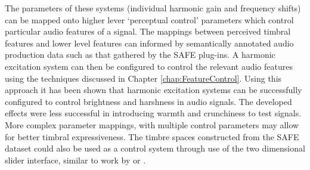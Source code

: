 	The parameters of these systems (individual harmonic gain and frequency shifts) can be mapped onto higher lever
	`perceptual control' parameters which control particular audio features of a signal. The mappings between perceived
	timbral features and lower level features can informed by semantically annotated audio production data such as that
	gathered by the SAFE plug-ins. A harmonic excitation system can then be configured to control the relevant audio
	features using the techniques discussed in Chapter \ref{chap:FeatureControl}. Using this approach it has been shown
	that harmonic excitation systems can be successfully configured to control brightness and harshness in audio
	signals. The developed effects were less successful in introducing warmth and crunchiness to test signals. More
	complex parameter mappings, with multiple control parameters may allow for better timbral expressiveness. The
	timbre spaces constructed from the SAFE dataset could also be used as a control system through use of the two
	dimensional slider interface, similar to work by \citet{schwarz2007corpus} or \citet{stasis2015a}.
